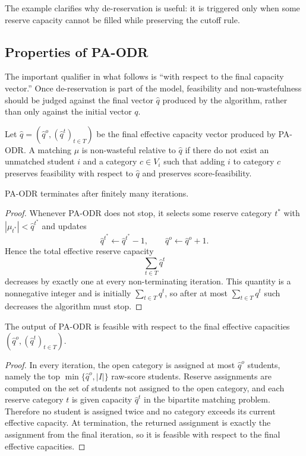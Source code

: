 \documentclass[runningheads]{llncs}
\newcommand{\1}{\mathbf{1}}
\begin{document}
The example clarifies why de-reservation is useful: it is triggered only when some reserve capacity cannot be filled while preserving the cutoff rule.

\subsection{Properties of PA-ODR}
The important qualifier in what follows is ``with respect to the final capacity vector.'' Once de-reservation is part of the model, feasibility and non-wastefulness should be judged against the final vector $\hat q$ produced by the algorithm, rather than only against the initial vector $q$.

\begin{definition}
Let $\hat q=(\hat q^o,(\hat q^t)_{t\in T})$ be the final effective capacity vector produced by PA-ODR. A matching $\mu$ is non-wasteful relative to $\hat q$ if there do not exist an unmatched student $i$ and a category $c\in V_i$ such that adding $i$ to category $c$ preserves feasibility with respect to $\hat q$ and preserves score-feasibility.
\end{definition}

\begin{proposition}[Termination]
PA-ODR terminates after finitely many iterations.
\end{proposition}

\begin{proof}
Whenever PA-ODR does not stop, it selects some reserve category $t^\ast$ with $|\mu_{t^\ast}|<\hat q^{t^\ast}$ and updates
\[
\hat q^{t^\ast}\gets \hat q^{t^\ast}-1,\qquad \hat q^o\gets \hat q^o+1.
\]
Hence the total effective reserve capacity
\[
\sum_{t\in T}\hat q^t
\]
decreases by exactly one at every non-terminating iteration. This quantity is a nonnegative integer and is initially $\sum_{t\in T}q^t$, so after at most $\sum_{t\in T}q^t$ such decreases the algorithm must stop.
\end{proof}

\begin{proposition}
The output of PA-ODR is feasible with respect to the final effective capacities $(\hat q^o,(\hat q^t)_{t\in T})$.
\end{proposition}

\begin{proof}
In every iteration, the open category is assigned at most $\hat q^o$ students, namely the top $\min\{\hat q^o,|I|\}$ raw-score students. Reserve assignments are computed on the set of students not assigned to the open category, and each reserve category $t$ is given capacity $\hat q^t$ in the bipartite matching problem. Therefore no student is assigned twice and no category exceeds its current effective capacity. At termination, the returned assignment is exactly the assignment from the final iteration, so it is feasible with respect to the final effective capacities.
\end{proof}
\end{document}

